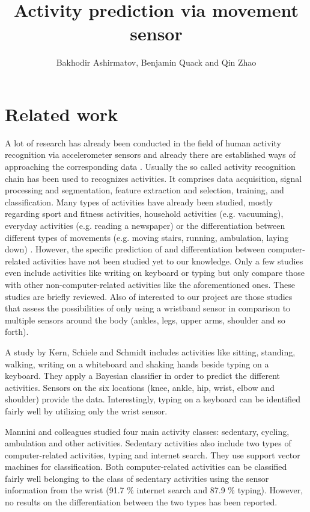 \documentclass[11pt,a4paper]{paper}
\title{Activity prediction via movement sensor}
\author{Bakhodir Ashirmatov, Benjamin Quack and Qin Zhao}
\begin{document}
\maketitle

\section{Related work}

A lot of research has already been conducted in the field of human activity recognition via
 accelerometer sensors and already there are established ways of approaching the corresponding data \cite{bullingetal2014}.
Usually the so called activity recognition chain has been used to recognizes activities. 
It comprises data acquisition, signal processing and segmentation, feature extraction and selection,
 training, and classification.
Many types of activities have already been studied, mostly regarding sport and fitness activities, household activities (e.g. vacuuming),
 everyday activities (e.g. reading a newspaper) or the differentiation between different types 
 of movements (e.g. moving stairs, running, ambulation, laying down) \cite{banosetal2014}.
However, the specific prediction of and differentiation between computer-related activities have not been studied yet to 
 our knowledge.
Only a few studies even include activities like writing on keyboard or typing but only compare those with other non-computer-related 
 activities like the aforementioned ones.
These studies are briefly reviewed.
Also of interested to our project are those studies that assess the possibilities of only using a wristband sensor in comparison 
 to multiple sensors around the body (ankles, legs, upper arms, shoulder and so forth).
 
A study by Kern, Schiele and Schmidt \cite{kernetal2003} includes activities like sitting, standing, walking, writing on a whiteboard and shaking
 hands beside typing on a keyboard.
They apply a Bayesian classifier in order to predict the different activities.
Sensors on the six locations (knee, ankle, hip, wrist, elbow and shoulder) provide the data.
Interestingly, typing on a keyboard can be identified fairly well by utilizing only the wrist sensor.

Mannini and colleagues \cite{manninietal2013} studied four main activity classes:
 sedentary, cycling, ambulation and other activities. 
Sedentary activities also include two types of computer-related activities, typing and 
 internet search.
They use support vector machines for classification. 
Both computer-related activities can be classified fairly well 
 belonging to the class of sedentary activities using the sensor 
 information from the wrist (91.7 \% internet search and 87.9 \% typing).
However, no results on the differentiation between the two types
 has been reported.
\end{document}

